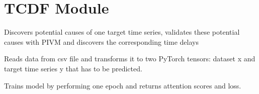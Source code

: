 \documentclass[letterpaper,10pt,english]{sphinxmanual}
\begin{document}
\chapter{TCDF Module}
\label{\detokenize{tcdf:module-tcdf}}\label{\detokenize{tcdf:tcdf-module}}\label{\detokenize{tcdf::doc}}

\begin{fulllineitems}
\label{\detokenize{tcdf:tcdf.findcauses}}
\sphinxAtStartPar
Discovers potential causes of one target time series, validates these potential causes with PIVM and discovers the corresponding time delays

\end{fulllineitems}


\begin{fulllineitems}
\label{\detokenize{tcdf:tcdf.preparedata}}
\sphinxAtStartPar
Reads data from csv file and transforms it to two PyTorch tensors: dataset x and target time series y that has to be predicted.

\end{fulllineitems}


\begin{fulllineitems}
\label{\detokenize{tcdf:tcdf.train}}
\sphinxAtStartPar
Trains model by performing one epoch and returns attention scores and loss.

\end{fulllineitems}
\end{document}
